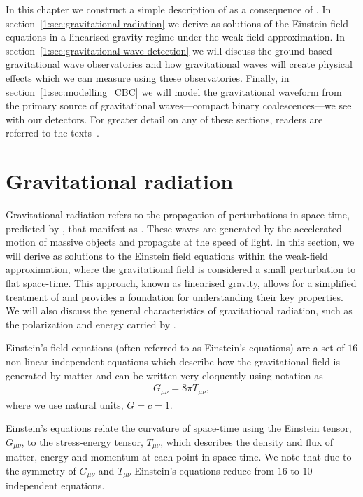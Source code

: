 In this chapter we construct a simple description of \gws as a consequence of \GR. In section~\ref{1:sec:gravitational-radiation} we derive \gws as solutions of the Einstein field equations in a linearised gravity regime under the weak-field approximation. In section~\ref{1:sec:gravitational-wave-detection} we will discuss the ground-based gravitational wave observatories and how gravitational waves will create physical effects which we can measure using these observatories. Finally, in section~\ref{1:sec:modelling_CBC} we will model the gravitational waveform from the primary source of gravitational waves---compact binary coalescences---we see with our detectors. For greater detail on any of these sections, readers are referred to the texts~\cite{Moore_book:2012, Schutz_book:2009, Maggiore_book:2007}.

\section{\label{1:sec:gravitational-radiation}Gravitational radiation}

Gravitational radiation refers to the propagation of perturbations in space-time, predicted by \GR, that manifest as \gws. These waves are generated by the accelerated motion of massive objects and propagate at the speed of light. In this section, we will derive \gws as solutions to the Einstein field equations within the weak-field approximation, where the gravitational field is considered a small perturbation to flat space-time. This approach, known as linearised gravity, allows for a simplified treatment of \gws and provides a foundation for understanding their key properties. We will also discuss the general characteristics of gravitational radiation, such as the polarization and energy carried by \gws.

Einstein's field equations (often referred to as Einstein's equations) are a set of $16$ non-linear independent equations which describe how the gravitational field is generated by matter and can be written very eloquently using \GR notation as
%
\begin{eqnarray}
    G_{\mu\nu} = 8\pi T_{\mu\nu},
    \label{2:eqn:EFE}
\end{eqnarray}
%
where we use natural units, $G = c = 1$.

Einstein's equations relate the curvature of space-time using the Einstein tensor, $G_{\mu\nu}$, to the stress-energy tensor, $T_{\mu\nu}$, which describes the density and flux of matter, energy and momentum at each point in space-time. We note that due to the symmetry of $G_{\mu\nu}$ and $T_{\mu\nu}$ Einstein's equations reduce from $16$ to $10$ independent equations.

